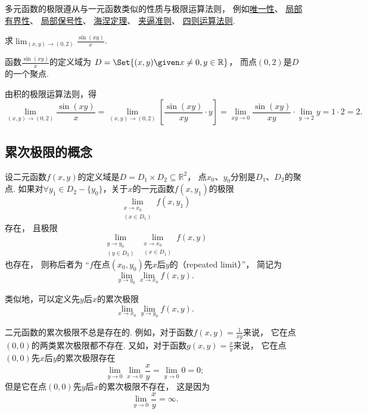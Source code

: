 多元函数的极限遵从与一元函数类似的性质与极限运算法则，
例如\hyperref[theorem:极限.函数极限的唯一性]{唯一性}、
\hyperref[theorem:极限.函数极限的局部有界性]{局部有界性}、
\hyperref[theorem:极限.函数极限的局部保号性1]{局部保号性}、
\hyperref[theorem:极限.海涅定理]{海涅定理}、
\hyperref[theorem:函数极限.夹逼准则]{夹逼准则}、
\hyperref[theorem:极限.极限的四则运算法则]{四则运算法则}.

\begin{example}
求\(\lim_{(x,y)\to(0,2)} \frac{\sin(xy)}{x}\).
\begin{solution}
函数\(\frac{\sin(xy)}{x}\)的定义域为
\(D = \Set{ (x,y) \given x\neq0, y\in\mathbb{R} }\)，
而点\((0,2)\)是\(D\)的一个聚点.

由积的极限运算法则，得\[
	\lim_{(x,y)\to(0,2)} \frac{\sin(xy)}{x}
	= \lim_{(x,y)\to(0,2)} \left[ \frac{\sin(xy)}{xy} \cdot y \right]
	= \lim_{xy\to0} \frac{\sin(xy)}{xy} \cdot \lim_{y\to2} y
	= 1 \cdot 2 = 2.
\]
\end{solution}
\end{example}

\subsection{累次极限的概念}
\begin{definition}
设二元函数\(f(x,y)\)的定义域是\(D = D_1 \times D_2 \subseteq \mathbb{R}^2\)，
点\(x_0\)、\(y_0\)分别是\(D_1\)、\(D_2\)的聚点.
如果对\(\forall y_1 \in D_2 - \{y_0\}\)，关于\(x\)的一元函数\(f(x,y_1)\)的极限\[
	\lim_{\substack{x \to x_0 \\ (x \in D_1)}} f(x,y_1)
\]存在，
且极限\[
	\lim_{\substack{y \to y_0 \\ (y \in D_2)}}
	\lim_{\substack{x \to x_0 \\ (x \in D_1)}} f(x,y)
\]也存在，
则称后者为
“\(f\)在点\((x_0,y_0)\)先\(x\)后\(y\)的（repeated limit）”，
简记为\[
	\lim_{y \to y_0} \lim_{x \to x_0} f(x,y).
\]

类似地，可以定义先\(y\)后\(x\)的累次极限\[
	\lim_{x \to x_0} \lim_{y \to y_0} f(x,y).
\]
\end{definition}

二元函数的累次极限不总是存在的.
例如，对于函数\(f(x,y)=\frac1{xy}\)来说，
它在点\((0,0)\)的两类累次极限都不存在.
又如，对于函数\(g(x,y)=\frac{x}{y}\)来说，
它在点\((0,0)\)先\(x\)后\(y\)的累次极限存在\[
	\lim_{y\to0}\lim_{x\to0}\frac{x}{y}
	=\lim_{y\to0}0
	=0;
\]
但是它在点\((0,0)\)先\(y\)后\(x\)的累次极限不存在，
这是因为\[
	\lim_{y\to0}\frac{x}{y}=\infty.
\]

